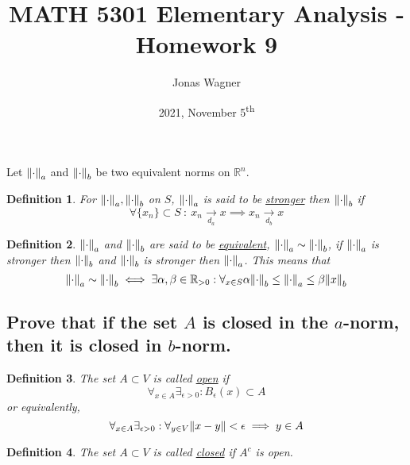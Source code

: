 \documentclass[]{article}
\title{MATH 5301 Elementary Analysis - Homework 9}
\author{Jonas Wagner}
\date{2021, November 5\textsuperscript{th}}
\newcommand{\R}{\mathbb{R}}
\newcommand{\st}{\ : \ }
\newtheorem{definition}{Definition}
\begin{document}
\maketitle

\section{}
Let $\norm{\cdot}_a$ and $\norm{\cdot}_b$ be two equivalent norms on $\R^n$.
\begin{definition}
    For $\norm{\cdot}_a, \norm{\cdot}_b$ on $S$, 
    $\norm{\cdot}_a$ is said to be \underline{stronger} then $\norm{\cdot}_b$ if 
    \[
        \forall \{x_n\} \subset S \st x_n \xrightarrow[d_a]{} x \implies x_n \xrightarrow[d_b]{} x
    \]
\end{definition}
\begin{definition}
    $\norm{\cdot}_a$ and $\norm{\cdot}_b$ are said to be \underline{equivalent},  $\norm{\cdot}_a \sim \norm{\cdot}_b$,
    if $\norm{\cdot}_a$ is stronger then $\norm{\cdot}_b$ 
    and $\norm{\cdot}_b$ is stronger then $\norm{\cdot}_a$. 
    This means that
    \[
        \norm{\cdot}_a \sim \norm{\cdot}_b 
            \iff \exists{\alpha,\beta \in \R_{>0}} : 
            \forall_{x\in S} \alpha \norm{\cdot}_b \leq \norm{\cdot}_a \leq \beta \norm{x}_b
    \]
\end{definition}

\subsection{Prove that if the set $A$ is closed in the $a$-norm, then it is closed in $b$-norm.}

\begin{definition}
    The set $A \subset V$ is called \underline{open} if 
    $$\forall_{x\in A} \exists_{\epsilon>0} : B_\epsilon(x)\subset A$$
    or equivalently,
    \[\forall_{x \in A} \exists_{\epsilon>0} : \forall_{y \in V}\norm{x - y} < \epsilon \implies y \in A\]
\end{definition}
\begin{definition}
    The set $A \subset V$ is called \underline{closed} if $A^c$ is open.
\end{definition}
\end{document}
